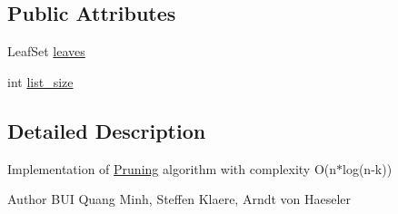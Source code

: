 \subsection*{Public Attributes}
\begin{DoxyCompactItemize}
\item 
LeafSet \hyperlink{classPruning_aa7b17e04be84e8605bef199af9c86656}{leaves}
\item 
int \hyperlink{classPruning_a0b7c9c3601f3facb5eeb9b40f4a11059}{list\_\-size}
\end{DoxyCompactItemize}


\subsection{Detailed Description}
Implementation of \hyperlink{classPruning}{Pruning} algorithm with complexity O(n$\ast$log(n-\/k))

\begin{DoxyAuthor}{Author}
BUI Quang Minh, Steffen Klaere, Arndt von Haeseler 
\end{DoxyAuthor}


